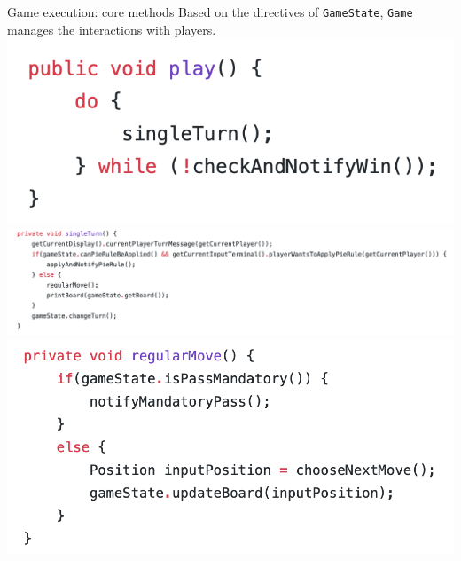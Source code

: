 \documentclass{beamer}
\begin{document}
\begin{frame}{Game execution: core methods}  
 Based on the directives of \texttt{GameState}, \texttt{Game} manages the interactions with players.
 \\
      \pause
\includegraphics[scale=0.30]{images/play.png}
    \pause
 \includegraphics[scale=0.30]{images/singleturn.png}
 \pause
 \includegraphics[scale=0.30]{images/regularmove.png}
\end{frame}
\end{document}
